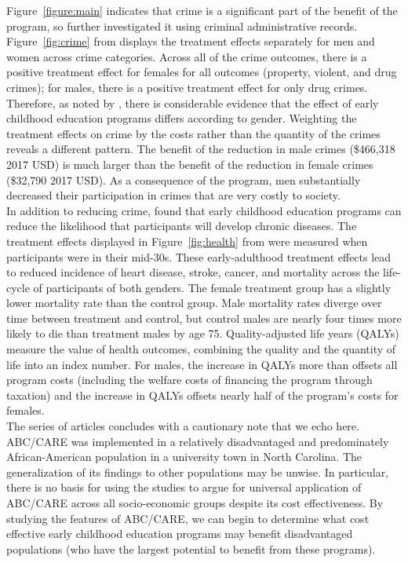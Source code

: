 \noindent Figure~\ref{figure:main} indicates that crime is a significant part of the benefit of the program, so \citet{Garcia_etal_2019_ECE_IMHJ} further investigated it using criminal administrative records. Figure~\ref{fig:crime} from \citet{Garcia_etal_2019_ECE_IMHJ} displays the treatment effects separately for men and women across crime categories. Across all of the crime outcomes, there is a positive treatment effect for females for all outcomes (property, violent, and drug crimes); for males, there is a positive treatment effect for only drug crimes. Therefore, as noted by \citet{Garcia_Heckman_Ziff_2018_EER}, there is considerable evidence that the effect of early childhood education programs differs according to gender. Weighting the treatment effects on crime by the costs rather than the quantity of the crimes reveals a different pattern. The benefit of the reduction in male crimes (\$466,318 2017 USD) is much larger than the benefit of the reduction in female crimes (\$32,790 2017 USD). As a consequence of the program, men substantially decreased their participation in crimes that are very costly to society. \\ 

\noindent In addition to reducing crime, \citet{Garcia_Heckman_2019_Early_HE} found that early childhood education programs can reduce the likelihood that participants will develop chronic diseases. The treatment effects displayed in Figure~\ref{fig:health} from \citet{Garcia_Heckman_2019_Early_HE} were measured when participants were in their mid-30s. These early-adulthood treatment effects lead to reduced incidence of heart disease, stroke, cancer, and mortality across the life-cycle of participants of both genders. The female treatment group has a slightly lower mortality rate than the control group. Male mortality rates diverge over time between treatment and control, but control males are nearly four times more likely to die than treatment males by age 75. Quality-adjusted life years (QALYs) measure the value of health outcomes, combining the quality and the quantity of life into an index number. For males, the increase in QALYs more than offsets all program costs (including the welfare costs of financing the program through taxation) and the increase in QALYs offsets nearly half of the program’s costs for females.\\

\noindent The series of articles concludes with a cautionary note that we echo here. ABC/CARE was implemented in a relatively disadvantaged and predominately African-American population in a university town in North Carolina. The generalization of its findings to other populations may be unwise. In particular, there is no basis for using the studies to argue for universal application of ABC/CARE across all socio-economic groups despite its cost effectiveness. By studying the features of ABC/CARE, we can begin to determine what cost effective early childhood education programs may benefit disadvantaged populations (who have the largest potential to benefit from these programs).


\singlespace





